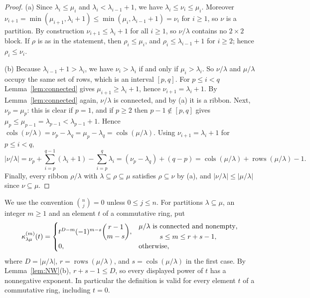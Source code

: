 \documentclass[11pt]{amsart}
\numberwithin{equation}{section}
\theoremstyle{definition}
\theoremstyle{remark}
\newcommand{\rows}{\operatorname{rows}}
\newcommand{\cols}{\operatorname{cols}}
\begin{document}
\begin{proof}
(a) Since $\lambda_i\leq\mu_i$ and $\lambda_i<\lambda_{i-1}+1$, we have
$\lambda_i\leq\nu_i\leq\mu_i$. Moreover
$\nu_{i+1}=\min(\mu_{i+1},\lambda_i+1)\leq\min(\mu_i,\lambda_{i-1}+1)=\nu_i$
for $i\geq1$, so $\nu$ is a partition. By construction
$\nu_{i+1}\leq\lambda_i+1$ for all $i\geq1$, so $\nu/\lambda$ contains no
$2\times2$ block. If $\rho$ is as in the statement,
then $\rho_i\leq\mu_i$, and $\rho_i\leq\lambda_{i-1}+1$ for $i\geq2$; hence $\rho_i\leq\nu_i$.

(b) Because $\lambda_{i-1}+1>\lambda_i$, we have $\nu_i>\lambda_i$ if and only
if $\mu_i>\lambda_i$. So $\nu/\lambda$ and $\mu/\lambda$ occupy the same set of
rows, which is an interval $[p,q]$. For
$p\leq i<q$ Lemma~\ref{lem:connected} gives $\mu_{i+1}\geq\lambda_i+1$, hence
$\nu_{i+1}=\lambda_i+1$. By Lemma~\ref{lem:connected} again, $\nu/\lambda$ is
connected, and by (a) it is a ribbon. Next, $\nu_p=\mu_p$: this is clear if
$p=1$, and if $p\geq2$ then $p-1\notin[p,q]$ gives
$\mu_p\leq\mu_{p-1}=\lambda_{p-1}<\lambda_{p-1}+1$. Hence
$\cols(\nu/\lambda)=\nu_p-\lambda_q=\mu_p-\lambda_q=\cols(\mu/\lambda)$. Using
$\nu_{i+1}=\lambda_i+1$ for $p\leq i<q$,
\[
 |\nu/\lambda|=\nu_p+\sum_{i=p}^{q-1}(\lambda_i+1)-\sum_{i=p}^{q}\lambda_i
 =(\nu_p-\lambda_q)+(q-p)=\cols(\mu/\lambda)+\rows(\mu/\lambda)-1 .
\]
Finally, every ribbon $\rho/\lambda$ with $\lambda\subseteq\rho\subseteq\mu$
satisfies $\rho\subseteq\nu$ by (a), and $|\nu/\lambda|\leq|\mu/\lambda|$ since
$\nu\subseteq\mu$.
\end{proof}

We use the convention $\binom{n}{j}=0$ unless $0\leq j\leq n$. For
partitions $\lambda\subseteq\mu$, an integer $m\geq1$ and an element $t$ of a
commutative ring, put
\begin{equation}\label{eq:kappa-def}
 \kappa^{(m)}_{\lambda\mu}(t)=
 \begin{cases}
 t^{D-m}(-1)^{m-s}\dbinom{r-1}{m-s},
 &\begin{gathered}
   \mu/\lambda\text{ is connected and nonempty},\\
   s\leq m\leq r+s-1,
  \end{gathered}\\[6pt]
 0,&\text{otherwise},
 \end{cases}
\end{equation}
where $D=|\mu/\lambda|$, $r=\rows(\mu/\lambda)$, and
$s=\cols(\mu/\lambda)$ in the first case. By
Lemma~\ref{lem:NW}(b), $r+s-1\leq D$, so every displayed power of
$t$ has a nonnegative exponent. In particular the definition is valid
for every element $t$ of a commutative ring, including $t=0$.
\end{document}
